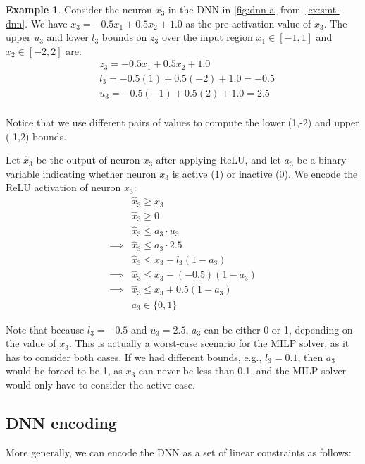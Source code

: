 \documentclass[oneside,11pt,dvipsnames]{book}
\numberwithin{equation}{section}
\theoremstyle{definition}
\newtheorem{example}{Example}[section]
\theoremstyle{remark}
\begin{document}
\begin{example}
    Consider the neuron $x_3$ in the DNN in \autoref{fig:dnn-a} from~\autoref{ex:smt-dnn}. 
    We have $x_3 = -0.5x_1 + 0.5x_2 + 1.0$ as the pre-activation value of $x_3$. The upper $u_3$ and lower $l_3$ bounds on $z_3$ over the input region $x_1 \in [-1,1]$ and $x_2\in[-2,2]$ are:
\begin{align*}
    & z_3 = -0.5x_1 + 0.5x_2 + 1.0 \\
    & l_3 = -0.5(1) + 0.5(-2) + 1.0 = -0.5 \\
    & u_3 = -0.5(-1) + 0.5(2) + 1.0 = 2.5 \\
\end{align*}

Notice that we use different pairs of values to compute the lower (1,-2) and upper (-1,2) bounds.



Let $\hat{x}_3$ be the output of neuron $x_3$ after applying ReLU, and let $a_3$ be a binary variable indicating whether neuron $x_3$ is active (1) or inactive (0).
We encode the ReLU activation of neuron $x_3$:
\begin{align*}
    &\hat{x}_3 \geq x_3 \\
    &\hat{x}_3 \geq 0 \\
    &\hat{x}_3 \leq a_3 \cdot u_3 \\
\implies  &\hat{x}_3 \leq a_3 \cdot 2.5 \\
    &\hat{x}_3 \leq x_3 - l_3(1-a_3) \\
\implies  &\hat{x}_3 \leq x_3 - (-0.5)(1-a_3) \\
\implies  &\hat{x}_3 \leq x_3 + 0.5(1-a_3) \\
    &a_3 \in \{0,1\}
\end{align*}

Note that because $l_3 = -0.5$ and $u_3 = 2.5$, $a_3$ can be either 0 or 1, depending on the value of $x_3$. This is actually a worst-case scenario for the MILP solver, as it has to consider both cases. If we had different bounds, e.g., $l_3 = 0.1$, then $a_3$ would be forced to be 1, as $x_3$ can never be less than 0.1, and the MILP solver would only have to consider the active case.
\end{example}


\subsection{DNN encoding} More generally, we can encode the DNN as a set of linear constraints as follows:
\end{document}

